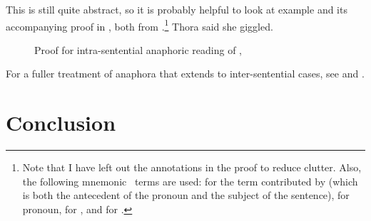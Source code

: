 \documentclass[output=paper,hidelinks]{langscibook}
\begin{document}
This is still quite abstract, so it is probably helpful to look at
example  and its 
accompanying proof in , both from
\citet[84]{Asudeh12}.\footnote{Note that I have left out the
\formula{\linimpE} annotations in the proof to reduce clutter. Also, 
the following mnemonic \glue\ terms are used:  for the term
contributed by  (which is both the antecedent of the
pronoun and the subject of the sentence),  for pronoun, 
 for , and  for .}
\ea
\label{ex:pro-ex} Thora said she giggled.
\z

\begin{figure}
  \centering
\caption{Proof for intra-sentential anaphoric reading of
  , }
\label{fig:pro-ex-proof} 
\end{figure}
%
For a fuller treatment of anaphora that extends to 
inter-sentential cases, see \citet{Haug2020-is} and \citet{dalrymple;haug22}.



\section{Conclusion}
\end{document}
